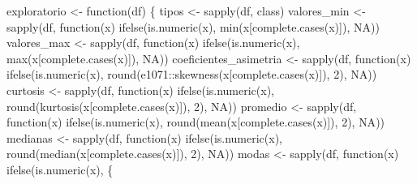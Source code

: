 \documentclass[
  10pt,
  letterpaper,
  DIV=11,
  numbers=noendperiod]{scrreprt}
\newenvironment{Shaded}{\begin{snugshade}}{\end{snugshade}}
\newcommand{\ConstantTok}[1]{\textcolor[rgb]{0.56,0.35,0.01}{#1}}
\newcommand{\ControlFlowTok}[1]{\textcolor[rgb]{0.00,0.23,0.31}{#1}}
\newcommand{\DecValTok}[1]{\textcolor[rgb]{0.68,0.00,0.00}{#1}}
\newcommand{\FunctionTok}[1]{\textcolor[rgb]{0.28,0.35,0.67}{#1}}
\newcommand{\NormalTok}[1]{\textcolor[rgb]{0.00,0.23,0.31}{#1}}
\newcommand{\OtherTok}[1]{\textcolor[rgb]{0.00,0.23,0.31}{#1}}
\newcommand{\SpecialCharTok}[1]{\textcolor[rgb]{0.37,0.37,0.37}{#1}}
\begin{document}
\begin{Shaded}
\begin{Highlighting}[numbers=left,,]
\NormalTok{exploratorio }\OtherTok{\textless{}{-}} \ControlFlowTok{function}\NormalTok{(df) \{}
\NormalTok{    tipos }\OtherTok{\textless{}{-}} \FunctionTok{sapply}\NormalTok{(df, class)}
\NormalTok{    valores\_min }\OtherTok{\textless{}{-}} \FunctionTok{sapply}\NormalTok{(df, }\ControlFlowTok{function}\NormalTok{(x) }\FunctionTok{ifelse}\NormalTok{(}\FunctionTok{is.numeric}\NormalTok{(x), }\FunctionTok{min}\NormalTok{(x[}\FunctionTok{complete.cases}\NormalTok{(x)]), }\ConstantTok{NA}\NormalTok{))}
\NormalTok{    valores\_max }\OtherTok{\textless{}{-}} \FunctionTok{sapply}\NormalTok{(df, }\ControlFlowTok{function}\NormalTok{(x) }\FunctionTok{ifelse}\NormalTok{(}\FunctionTok{is.numeric}\NormalTok{(x), }\FunctionTok{max}\NormalTok{(x[}\FunctionTok{complete.cases}\NormalTok{(x)]), }\ConstantTok{NA}\NormalTok{))}
\NormalTok{    coeficientes\_asimetria }\OtherTok{\textless{}{-}} \FunctionTok{sapply}\NormalTok{(df, }\ControlFlowTok{function}\NormalTok{(x) }\FunctionTok{ifelse}\NormalTok{(}\FunctionTok{is.numeric}\NormalTok{(x), }\FunctionTok{round}\NormalTok{(e1071}\SpecialCharTok{::}\FunctionTok{skewness}\NormalTok{(x[}\FunctionTok{complete.cases}\NormalTok{(x)]), }\DecValTok{2}\NormalTok{), }\ConstantTok{NA}\NormalTok{))}
\NormalTok{    curtosis }\OtherTok{\textless{}{-}} \FunctionTok{sapply}\NormalTok{(df, }\ControlFlowTok{function}\NormalTok{(x) }\FunctionTok{ifelse}\NormalTok{(}\FunctionTok{is.numeric}\NormalTok{(x), }\FunctionTok{round}\NormalTok{(}\FunctionTok{kurtosis}\NormalTok{(x[}\FunctionTok{complete.cases}\NormalTok{(x)]), }\DecValTok{2}\NormalTok{), }\ConstantTok{NA}\NormalTok{))}
\NormalTok{    promedio }\OtherTok{\textless{}{-}} \FunctionTok{sapply}\NormalTok{(df, }\ControlFlowTok{function}\NormalTok{(x) }\FunctionTok{ifelse}\NormalTok{(}\FunctionTok{is.numeric}\NormalTok{(x), }\FunctionTok{round}\NormalTok{(}\FunctionTok{mean}\NormalTok{(x[}\FunctionTok{complete.cases}\NormalTok{(x)]), }\DecValTok{2}\NormalTok{), }\ConstantTok{NA}\NormalTok{))}
\NormalTok{    medianas }\OtherTok{\textless{}{-}} \FunctionTok{sapply}\NormalTok{(df, }\ControlFlowTok{function}\NormalTok{(x) }\FunctionTok{ifelse}\NormalTok{(}\FunctionTok{is.numeric}\NormalTok{(x), }\FunctionTok{round}\NormalTok{(}\FunctionTok{median}\NormalTok{(x[}\FunctionTok{complete.cases}\NormalTok{(x)]), }\DecValTok{2}\NormalTok{), }\ConstantTok{NA}\NormalTok{))}
\NormalTok{    modas }\OtherTok{\textless{}{-}} \FunctionTok{sapply}\NormalTok{(df, }\ControlFlowTok{function}\NormalTok{(x) }\FunctionTok{ifelse}\NormalTok{(}\FunctionTok{is.numeric}\NormalTok{(x), \{}

\end{Highlighting}
\end{Shaded}
\end{document}
